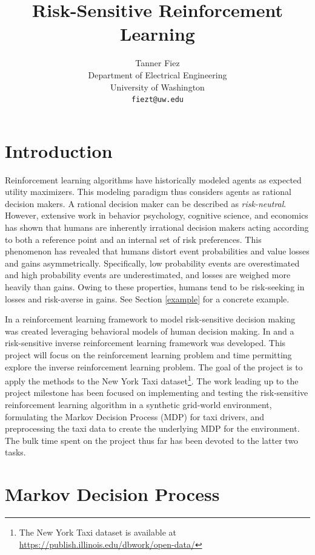 \documentclass{article}
\title{Risk-Sensitive Reinforcement Learning}
\author{
  Tanner Fiez \\
  Department of Electrical Engineering \\
  University of Washington \\
  \texttt{fiezt@uw.edu} \\
}
\begin{document}
\maketitle

\section{Introduction}
Reinforcement learning algorithms have historically modeled agents as expected utility maximizers. This modeling paradigm thus considers agents as rational decision makers. A rational decision maker can be described as \emph{risk-neutral}. However, extensive work in behavior psychology, cognitive science, and economics has shown that humans are inherently irrational decision makers acting according to both a reference point and an internal set of risk preferences. This phenomenon has revealed that humans distort event probabilities and value losses and gains asymmetrically. Specifically, low probability events are overestimated and high probability events are underestimated, and losses are weighed more heavily than gains. Owing to these properties, humans tend to be risk-seeking in losses and risk-averse in gains. See Section \ref{example} for a concrete example.

In \cite{DBLP:journals/corr/ShenTSO13} a reinforcement learning framework to model risk-sensitive decision making was created leveraging behavioral models of human decision making. In \cite{mazumdar:2017aa} and \cite{ratliff:2017aa} a risk-sensitive inverse reinforcement learning framework was developed. This project will focus on the reinforcement learning problem and time permitting explore the inverse reinforcement learning problem. The goal of the project is to apply the methods to the New York Taxi dataset\footnote{The New York Taxi dataset is available at \url{https://publish.illinois.edu/dbwork/open-data/}}. The work leading up to the project milestone has been focused on implementing and testing the risk-sensitive reinforcement learning algorithm in a synthetic grid-world environment, formulating the Markov Decision Process (MDP) for taxi drivers, and preprocessing the taxi data to create the underlying MDP for the environment. The bulk time spent on the project thus far has been devoted to the latter two tasks.

\section{Markov Decision Process}
\end{document}
